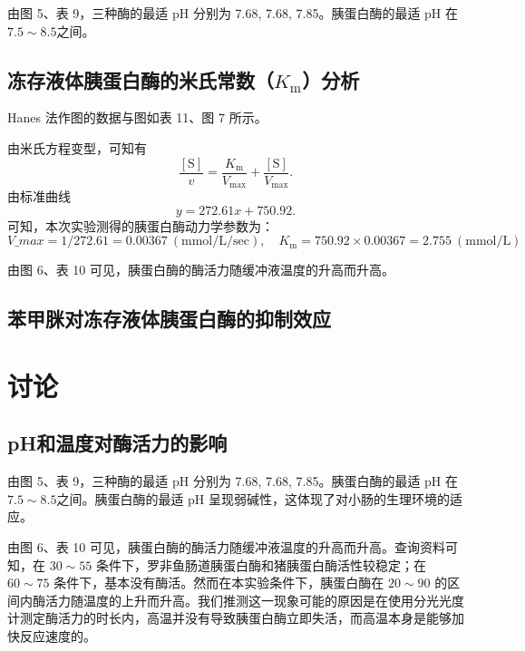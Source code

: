 \documentclass[11pt,UTF8]{ctexart}
\begin{document}
    由图 5、表 9，三种酶的最适 pH 分别为 7.68, 7.68, 7.85。胰蛋白酶的最适 pH 在\(7.5\sim 8.5\)之间。

    \subsection{冻存液体胰蛋白酶的米氏常数（\(K_\mathrm{m}\)）分析}
    Hanes 法作图的数据与图如表 11、图 7 所示。

    由米氏方程变型，可知有
    \begin{equation}
        \frac{\mathrm{[S]}}{v}=\frac{K_\mathrm{m}}{V_\max}+\frac{\mathrm{[S]}}{V_\max}.
    \end{equation}
    由标准曲线
    \begin{equation}
        y = 272.61x + 750.92.
    \end{equation}
    可知，本次实验测得的胰蛋白酶动力学参数为：
    \begin{equation}
        V\_max = 1/272.61 = 0.00367\ \mathrm{(mmol/L/sec)}, \quad K_\mathrm{m} = 750.92\times 0.00367 = 2.755\ \mathrm{(mmol/L)}
    \end{equation}

    由图 6、表 10 可见，胰蛋白酶的酶活力随缓冲液温度的升高而升高。

    \subsection{苯甲脒对冻存液体胰蛋白酶的抑制效应}


    \section{讨论}
    \subsection{pH和温度对酶活力的影响}
    由图 5、表 9，三种酶的最适 pH 分别为 7.68, 7.68, 7.85。胰蛋白酶的最适 pH 在\(7.5\sim 8.5\)之间。胰蛋白酶的最适 pH 呈现弱碱性，这体现了对小肠的生理环境的适应。

    由图 6、表 10 可见，胰蛋白酶的酶活力随缓冲液温度的升高而升高。查询资料可知，在 \(30\sim 55\) \textcelsius 条件下，罗非鱼肠道胰蛋白酶和猪胰蛋白酶活性较稳定；在 \(60\sim 75\) \textcelsius 条件下，基本没有酶活。然而在本实验条件下，胰蛋白酶在 \(20\sim 90\) \textcelsius 的区间内酶活力随温度的上升而升高。我们推测这一现象可能的原因是在使用分光光度计测定酶活力的时长内，高温并没有导致胰蛋白酶立即失活，而高温本身是能够加快反应速度的。
    
\end{document}
